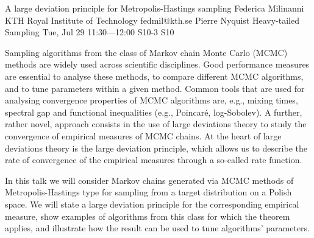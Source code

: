 \begin{talk}
  {A large deviation principle for Metropolis-Hastings sampling}%
  {Federica Milinanni}%
  {KTH Royal Institute of Technology}%
  {fedmil@kth.se}%
  {Pierre Nyquist}%
  {Heavy-tailed Sampling}%
  {Tue, Jul 29 11:30---12:00}%
  {S10-3}%
  {S10}%
    
   
   
Sampling algorithms from the class of Markov chain Monte Carlo (MCMC) methods are widely used across scientific disciplines. Good performance measures are essential to analyse these methods, to compare different MCMC algorithms, and to tune parameters within a given method. Common tools that are used for analysing convergence properties of MCMC algorithms are, e.g., mixing times, spectral gap and functional inequalities (e.g., Poincar\'e, log-Sobolev). A further, rather novel, approach consists in the use of large deviations theory to study the convergence of empirical measures of MCMC chains. At the heart of large deviations theory is the large deviation principle, which allows us to describe the rate of convergence of the empirical measures through a so-called rate function.

In this talk we will consider Markov chains generated via MCMC methods of Metropolis-Hastings type for sampling from a target distribution on a Polish space. We will state a large deviation principle for the corresponding empirical measure, show examples of algorithms from this class for which the theorem applies, and illustrate how the result can be used to tune algorithms' parameters.

\medskip

\end{talk}

